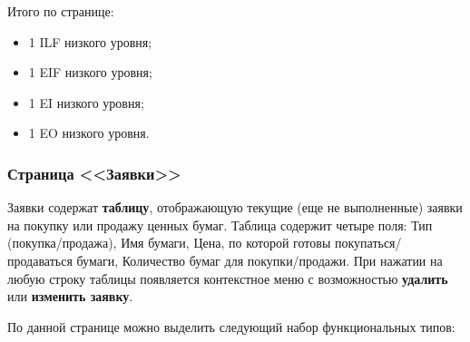 Итого по странице:

\begin{itemize}
    \item 1 ILF низкого уровня;
    \item 1 EIF низкого уровня;
    \item 1 EI низкого уровня;
    \item 1 EO низкого уровня.
\end{itemize}

\subsubsection{Страница <<Заявки>>}

Заявки содержат \textbf{таблицу}, отображающую текущие (еще не выполненные) заявки на покупку или продажу ценных бумаг. Таблица содержит четыре поля: Тип (покупка/продажа), Имя бумаги, Цена, по которой готовы покупаться/продаваться бумаги, Количество бумаг для покупки/продажи. При нажатии на любую строку таблицы появляется контекстное меню с возможностью \textbf{удалить} или \textbf{изменить заявку}.

По данной странице можно выделить следующий набор функциональных типов:


